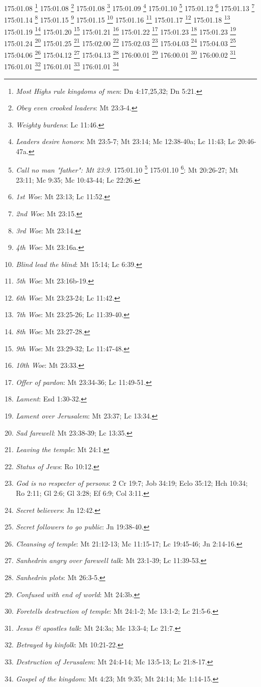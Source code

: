 {{{{{{{{{{{{{{{{{{{{{{{{{{{{{{{{{{{{{{{{{{{{{{{{{{{{{{{{{{{{{{{{175:01.08 \footnote{\textit{Most Highs rule kingdoms of men}: Dn 4:17,25,32; Dn 5:21.}
175:01.08 \footnote{\textit{Obey even crooked leaders}: Mt 23:3-4.}
175:01.08 \footnote{\textit{Weighty burdens}: Lc 11:46.}
175:01.09 \footnote{\textit{Leaders desire honors}: Mt 23:5-7; Mt 23:14; Mc 12:38-40a; Lc 11:43; Lc 20:46-47a.}
175:01.10 \footnote{\textit{Call no man "father": Mt 23:9.}
175:01.10 \footnote{\textit{Humbled / exalted}: Mt 18:1-4; Mt 23:12; Lc 1:52; Lc 14:11; Lc 18:14.}
175:01.10 \footnote{\textit{Who would be greatest}: serve}: Mt 20:26-27; Mt 23:11; Mc 9:35; Mc 10:43-44; Lc 22:26.}
175:01.12 \footnote{\textit{1st Woe}: Mt 23:13; Lc 11:52.}
175:01.13 \footnote{\textit{2nd Woe}: Mt 23:15.}
175:01.14 \footnote{\textit{3rd Woe}: Mt 23:14.}
175:01.15 \footnote{\textit{4th Woe}: Mt 23:16a.}
175:01.15 \footnote{\textit{Blind lead the blind}: Mt 15:14; Lc 6:39.}
175:01.16 \footnote{\textit{5th Woe}: Mt 23:16b-19.}
175:01.17 \footnote{\textit{6th Woe}: Mt 23:23-24; Lc 11:42.}
175:01.18 \footnote{\textit{7th Woe}: Mt 23:25-26; Lc 11:39-40.}
175:01.19 \footnote{\textit{8th Woe}: Mt 23:27-28.}
175:01.20 \footnote{\textit{9th Woe}: Mt 23:29-32; Lc 11:47-48.}
175:01.21 \footnote{\textit{10th Woe}: Mt 23:33.}
175:01.22 \footnote{\textit{Offer of pardon}: Mt 23:34-36; Lc 11:49-51.}
175:01.23 \footnote{\textit{Lament}: Esd 1:30-32.}
175:01.23 \footnote{\textit{Lament over Jerusalem}: Mt 23:37; Lc 13:34.}
175:01.24 \footnote{\textit{Sad farewell}: Mt 23:38-39; Lc 13:35.}
175:01.25 \footnote{\textit{Leaving the temple}: Mt 24:1.}
175:02.00 \footnote{\textit{Status of Jews}: Ro 10:12.}
175:02.03 \footnote{\textit{God is no respecter of persons}: 2 Cr 19:7; Job 34:19; Eclo 35:12; Hch 10:34; Ro 2:11; Gl 2:6; Gl 3:28; Ef 6:9; Col 3:11.}
175:04.03 \footnote{\textit{Secret believers}: Jn 12:42.}
175:04.03 \footnote{\textit{Secret followers to go public}: Jn 19:38-40.}
175:04.06 \footnote{\textit{Cleansing of temple}: Mt 21:12-13; Mc 11:15-17; Lc 19:45-46; Jn 2:14-16.}
175:04.12 \footnote{\textit{Sanhedrin angry over farewell talk}: Mt 23:1-39; Lc 11:39-53.}
175:04.13 \footnote{\textit{Sanhedrin plots}: Mt 26:3-5.}
176:00.01 \footnote{\textit{Confused with end of world}: Mt 24:3b.}
176:00.01 \footnote{\textit{Foretells destruction of temple}: Mt 24:1-2; Mc 13:1-2; Lc 21:5-6.}
176:00.02 \footnote{\textit{Jesus & apostles talk}: Mt 24:3a; Mc 13:3-4; Lc 21:7.}
176:01.01 \footnote{\textit{Betrayed by kinfolk}: Mt 10:21-22.}
176:01.01 \footnote{\textit{Destruction of Jerusalem}: Mt 24:4-14; Mc 13:5-13; Lc 21:8-17.}
176:01.01 \footnote{\textit{Gospel of the kingdom}: Mt 4:23; Mt 9:35; Mt 24:14; Mc 1:14-15.}
}}}}}}}}}}}}}}}}}}}}}}}}}}}}}}}}}}}}}}}}}}}}}}}}}}}}}}}}}}}}}}}}
